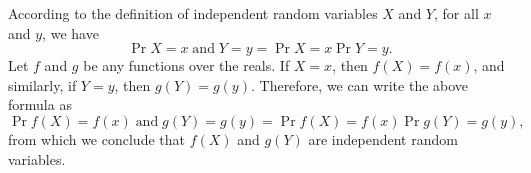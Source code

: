 According to the definition of independent random variables $X$ and $Y$, for all $x$ and $y$, we have
\[
    \Pr{X=x\;\text{and}\;Y=y} = \Pr{X=x}\Pr{Y=y}.
\]
Let $f$ and $g$ be any functions over the reals.
If $X=x$, then $f(X)=f(x)$, and similarly, if $Y=y$, then $g(Y)=g(y)$.
Therefore, we can write the above formula as
\[
    \Pr{f(X)=f(x)\;\text{and}\;g(Y)=g(y)} = \Pr{f(X)=f(x)}\Pr{g(Y)=g(y)},
\]
from which we conclude that $f(X)$ and $g(Y)$ are independent random variables.
